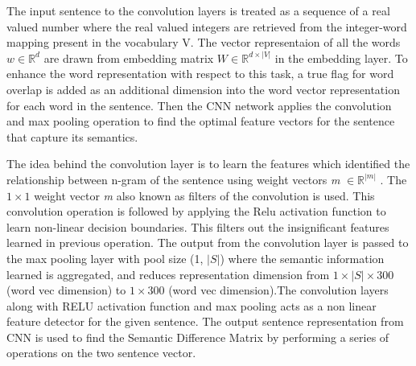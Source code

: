 \documentclass[12pt]{report} %
\begin{document}
	The input sentence to the convolution layers is treated as a sequence of a real valued number where the real valued integers are retrieved from the integer-word mapping present in the vocabulary V. The vector representaion of all the words $ w \in \mathbb{R}^{d}  $ are drawn from embedding matrix  $ W \in \mathbb{R}^{d \times |V|} $ in the embedding layer. To enhance the word representation with respect to this task, a true flag for word overlap is added as an additional dimension into the word vector representation for each word in the sentence. Then the CNN network applies the convolution and max pooling operation to find the optimal feature vectors for the sentence that capture its semantics. 
	
	The idea behind the convolution layer is to learn the features which identified the relationship between n-gram of the sentence using weight vectors \textit{m} $\in \mathbb{R}^{|m|}$ . The $1 \times 1$ weight vector \textit{m} also known as filters of the convolution is used. This convolution operation is followed by applying the Relu activation function to learn non-linear decision boundaries. This filters out the insignificant features learned in previous operation. The output from the convolution layer is passed to the max pooling layer with pool size (1, $|S|$) where the semantic information learned is aggregated, and reduces representation dimension from $1 \times |S| \times 300$ (word vec dimension) to $1 \times 300$ (word vec dimension).The convolution layers along with RELU activation function and max pooling acts as a non linear  feature detector for the given sentence. The output sentence representation from CNN is used to find the Semantic Difference Matrix by performing a series of operations on the two sentence vector. 
	
\end{document}
